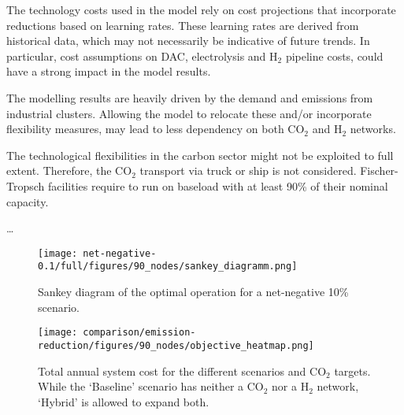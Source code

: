 \documentclass[twocolumn]{article}
\newcommand{\carbon}{CO$_2$}
\newcommand{\hydrogen}{H$_2$}
\begin{document}
The technology costs used in the model rely on cost projections that incorporate reductions based on learning rates. These learning rates are derived from historical data, which may not necessarily be indicative of future trends. In particular, cost assumptions on DAC, electrolysis and \hydrogen{} pipeline costs, could have a strong impact in the model results.

The modelling results are heavily driven by the demand and emissions from industrial clusters. Allowing the model to relocate these and/or incorporate flexibility measures, may lead to less dependency on both \carbon{} and \hydrogen{} networks.

The technological flexibilities in the carbon sector might not be exploited to full extent. Therefore, the \carbon{} transport via truck or ship is not considered. Fischer-Tropsch facilities require to run on baseload with at least 90\% of their nominal capacity.

\dots





\printbibliography

\appendix



\begin{figure*}
    \centering
    \texttt{[image: net-negative-0.1/full/figures/90\_nodes/sankey\_diagramm.png]}
    \caption{Sankey diagram of the optimal operation for a net-negative 10\% scenario.}
    \label{fig:sankey_diagramm}
\end{figure*}

\begin{figure}
    \centering
    \texttt{[image: comparison/emission-reduction/figures/90\_nodes/objective\_heatmap.png]}
    \caption{Total annual system cost for the different scenarios and \carbon{} targets. While the `Baseline' scenario has neither a \carbon{} nor a \hydrogen{} network, `Hybrid' is allowed to expand both.}
    \label{fig:objective_heatmap}
\end{figure}
\end{document}
